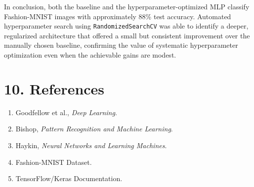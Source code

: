 \documentclass[11pt]{article}
\begin{document}
In conclusion, both the baseline and the hyperparameter-optimized MLP classify Fashion-MNIST images with approximately 88\% test accuracy. Automated hyperparameter search using \texttt{RandomizedSearchCV} was able to identify a deeper, regularized architecture that offered a small but consistent improvement over the manually chosen baseline, confirming the value of systematic hyperparameter optimization even when the achievable gains are modest.

\section*{10. References}
\begin{enumerate}
\item Goodfellow et al., \emph{Deep Learning}.
\item Bishop, \emph{Pattern Recognition and Machine Learning}.
\item Haykin, \emph{Neural Networks and Learning Machines}.
\item Fashion-MNIST Dataset.
\item TensorFlow/Keras Documentation.
\end{enumerate}
\end{document}
